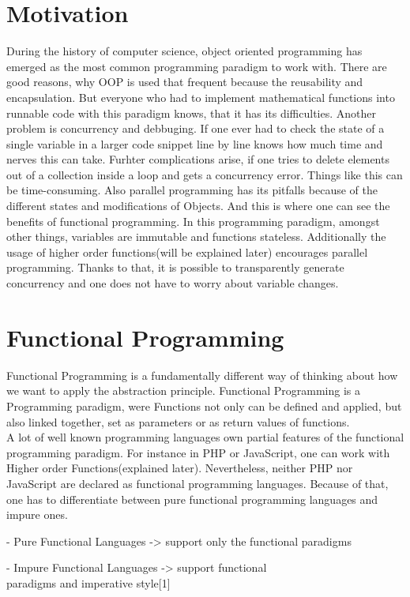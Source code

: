 \section{Motivation}
During the history of computer science, object oriented programming has emerged as the most common programming paradigm to work with. There are good reasons, why OOP is used that frequent because the reusability and encapsulation. But everyone who had to implement mathematical functions into runnable code with this paradigm knows, that it has its difficulties. Another problem is concurrency and debbuging. If one ever had to check the state of a single variable in a larger code snippet line by line knows how much time and nerves this can take. Furhter complications arise, if one tries to delete elements out of a collection inside a loop and gets a concurrency error. Things like this can be time-consuming. Also parallel programming has its pitfalls because of the different states and modifications of Objects. And this is where one can see the benefits of functional programming. In this programming paradigm, amongst other things, variables are immutable and functions stateless. Additionally the usage of higher order functions(will be explained later) encourages parallel programming. Thanks to that, it is possible to transparently generate concurrency and one does not have to worry about variable changes.\\
\section{Functional Programming}
Functional Programming is a fundamentally  different way of thinking about how we want to apply the abstraction principle. Functional Programming is a Programming paradigm, were Functions not only can be defined and applied, but also linked together, set as parameters or as return values of functions.\\
A lot of well known programming languages own partial features of the functional programming paradigm. For instance in PHP or JavaScript, one can work with Higher order Functions(explained later). Nevertheless, neither PHP nor JavaScript are declared as functional programming languages. Because of that, one has to differentiate between pure functional programming languages and impure ones.\\
\begin{MyIndentedList}
    \begin{MyIndentedList}
        \item - Pure Functional Languages -> support only the functional paradigms
        \item - Impure Functional Languages -> support functional\\ paradigms and imperative style[1]
    \end{MyIndentedList}
\end{MyIndentedList}
